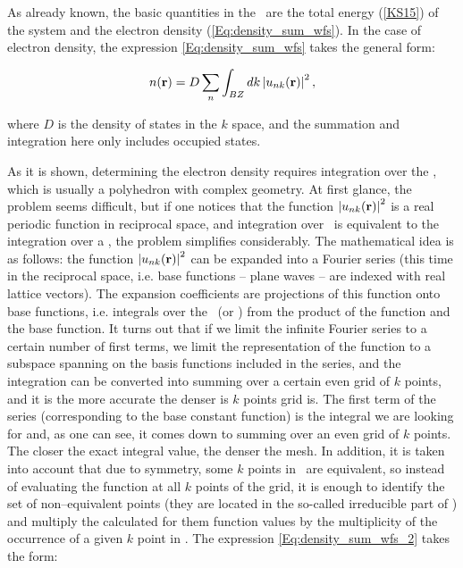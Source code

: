 As already known, the basic quantities in the \DFT\ are the total energy (\ref{KS15}) of the system and the electron density (\ref{Eq:density_sum_wfs}).
In the case of electron density, the expression \ref{Eq:density_sum_wfs} takes the general form:

\begin{equation}
    \label{Eq:density_sum_wfs_2}
    n(\mathbf{r})=D\sum_{n}\int_{BZ}dk\left|u_{nk}(\mathbf{r})\right|^2,
\end{equation}

where $D$ is the density of states in the $k$ space, and the summation and integration here only includes occupied states.

As it is shown, determining the electron density requires integration over the \BZ, which is usually a polyhedron with complex geometry.
At first glance, the problem seems difficult, but if one notices that the function $\left|u_{nk}(\mathbf{r})\right|^2$ is a real periodic function in reciprocal space, and integration over \BZ\ is equivalent to the integration over a \prim, the problem simplifies considerably.
The mathematical idea is as follows: the function $\left|u_{nk}(\mathbf{r})\right|^2$ can be expanded into a Fourier series (this time in the reciprocal space, i.e. base functions -- plane waves -- are indexed with real lattice vectors).
The expansion coefficients are projections of this function onto base functions, i.e. integrals over the \prim\ (or \BZ) from the product of the function and the base function.
It turns out that if we limit the infinite Fourier series to a certain number of first terms, we limit the representation of the function to a subspace spanning on the basis functions included in the series, and the integration can be converted into summing over a certain even grid of $k$ points, and it is the more accurate the denser is $k$ points grid is.
The first term of the series (corresponding to the base constant function) is the integral we are looking for and, as one can see, it comes down to summing over an even grid of $k$ points.
The closer the exact integral value, the denser the mesh.
In addition, it is taken into account that due to symmetry, some $k$ points in \BZ\ are equivalent, so instead of evaluating the function at all $k$ points of the grid, it is enough to identify the set of non--equivalent points (they are located in the so-called irreducible part of \BZ) and multiply the calculated for them function values by the multiplicity of the occurrence of a given $k$ point in \BZ.
The expression \ref{Eq:density_sum_wfs_2} takes the form:

